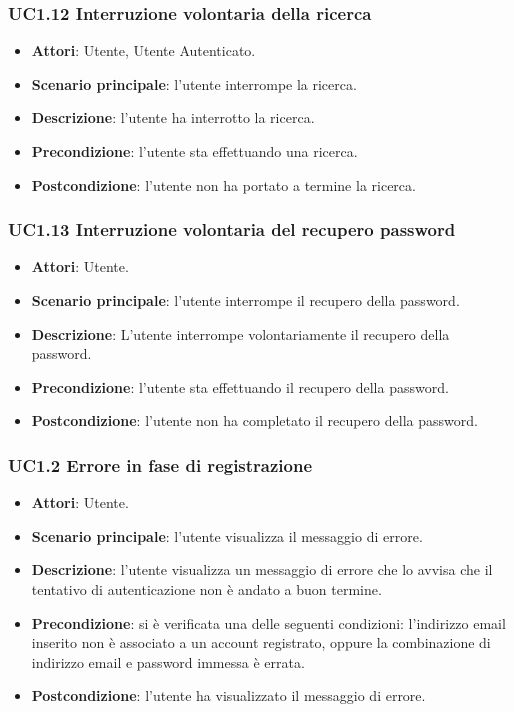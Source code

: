 \subsubsection{UC1.12 Interruzione volontaria della ricerca}
\begin{itemize}
\item \textbf{Attori}: Utente, Utente Autenticato.
\item \textbf{Scenario principale}: l'utente interrompe la ricerca.
\item \textbf{Descrizione}: l'utente ha interrotto la ricerca.
\item \textbf{Precondizione}: l'utente sta effettuando una ricerca.
\item \textbf{Postcondizione}: l'utente non ha portato a termine la ricerca.
\end{itemize}
\subsubsection{UC1.13 Interruzione volontaria del recupero password}
\begin{itemize}
\item \textbf{Attori}: Utente.
\item \textbf{Scenario principale}: l'utente interrompe il recupero della password.
\item \textbf{Descrizione}: L'utente interrompe volontariamente il recupero della password.
\item \textbf{Precondizione}: l'utente sta effettuando il recupero della password.
\item \textbf{Postcondizione}: l'utente non ha completato il recupero della password.
\end{itemize}
\subsubsection{UC1.2 Errore in fase di registrazione}
\begin{itemize}
\item \textbf{Attori}: Utente.
\item \textbf{Scenario principale}: l'utente visualizza il messaggio di errore.
\item \textbf{Descrizione}: l'utente visualizza un messaggio di errore che lo avvisa che il tentativo di autenticazione non è andato a buon termine.
\item \textbf{Precondizione}: si è verificata una delle seguenti condizioni: l'indirizzo email inserito non è associato a un account registrato, oppure la combinazione di indirizzo email e password immessa è errata.
\item \textbf{Postcondizione}: l'utente ha visualizzato il messaggio di errore.
\end{itemize}
